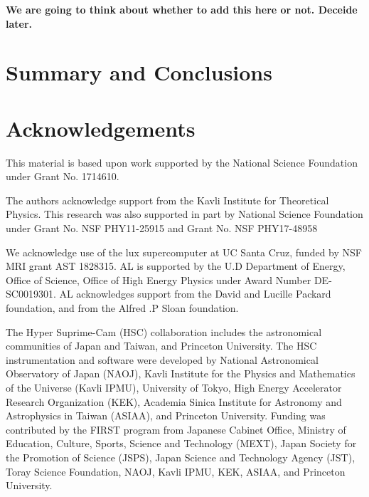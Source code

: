 \documentclass[a4paper,fleqn,usenatbib]{mnras}
\begin{document}
\textbf{We are going to think about whether to add this here or not. Deceide later.}


\section{Summary and Conclusions}
    \label{sec:summary}
    


\section*{Acknowledgements}


  This material is based upon work supported by the National Science Foundation under 
  Grant No. 1714610. 
  
  The authors acknowledge support from the Kavli Institute for Theoretical Physics.
  This research was also supported in part by National Science Foundation under Grant 
  No. NSF PHY11-25915 and Grant No. NSF PHY17-48958
  
  We acknowledge use of the lux supercomputer at UC Santa Cruz, funded by NSF MRI grant AST
  1828315. AL is supported by the U.D Department of Energy, Office of Science, Office of High
  Energy Physics under Award Number DE-SC0019301. AL acknowledges support from the David and
  Lucille Packard foundation, and from the Alfred .P Sloan foundation.

  The Hyper Suprime-Cam (HSC) collaboration includes the astronomical communities of 
  Japan and Taiwan, and Princeton University.  The HSC instrumentation and software were
  developed by National Astronomical Observatory of Japan (NAOJ), Kavli Institute
  for the Physics and Mathematics of the Universe (Kavli IPMU), University of Tokyo,
  High Energy Accelerator Research Organization (KEK), Academia Sinica Institute
  for Astronomy and Astrophysics in Taiwan (ASIAA), and Princeton University.  
  Funding was contributed by the FIRST program from Japanese Cabinet Office,  Ministry 
  of Education, Culture, Sports, Science and Technology (MEXT), Japan Society for 
  the Promotion of Science (JSPS), Japan Science and Technology Agency (JST), Toray 
  Science Foundation, NAOJ, Kavli IPMU, KEK, ASIAA, and Princeton University.
   
\end{document}
